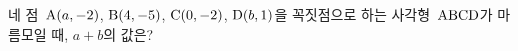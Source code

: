 네 점~$\mathrm{A}(a{,}\mkern3mu\mathopen{}-2)$, $\mathrm{B}(4{,}\mkern3mu\mathopen{}-5)$, $\mathrm{C}(0{,}\mkern3mu\mathopen{}-2)$, $\mathrm{D}(b{,}\mkern3mu\mathopen{}1)$을 꼭짓점으로 하는 사각형~$\mathrm{ABCD}$가 마름모일 때, $a+b$의 값은?
